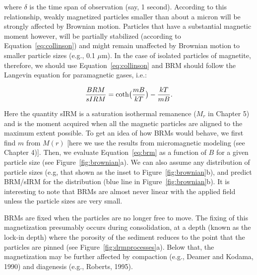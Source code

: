 \noindent where $\delta$ is the time span of observation (say, 1 second).  According to this relationship, weakly magnetized particles smaller than about a micron will  be strongly affected by Brownian motion.   Particles that have a substantial magnetic moment however, will be partially stabilized (according to Equation~\ref{eq:collinson}) and might remain unaffected by Brownian motion to smaller particle sizes (e.g., 0.1 $\mu$m).    In the case of isolated particles of magnetite, therefore, we should use Equation~\ref{eq:collinson} and BRM should follow the Langevin equation   for paramagnetic gases, i.e.:  

\begin{equation}
{ BRM\over{sIRM} } = { \hbox{coth} \bigl( {mB \over {kT}}\bigr)  - { kT \over {mB} }}.
\label{eq:brm}
\end{equation}

\noindent Here the quantity sIRM is a saturation isothermal remanence ($M_r$ in Chapter 5) and is the moment acquired when all the magnetic particles are aligned to the maximum extent possible.  To get an idea of how BRMs would behave, we first find $m$ from $M(r)$ [here we use the results from micromagnetic modeling (see Chapter 4)].     Then, we  evaluate Equation~\ref{eq:brm} as a function of $B$ for a given  particle size (see Figure~\ref{fig:brownian}a).     We can also assume any  distribution of particle sizes (e.g, that shown as the inset to Figure~\ref{fig:brownian}b), and  predict BRM/sIRM for the distribution (blue line in Figure~\ref{fig:brownian}b).   It is interesting to note that BRMs  are almost never linear with the applied field unless the particle sizes are very small.    




BRMs are   fixed when the particles are no longer free to move.  The fixing of this magnetization presumably occurs during consolidation, at a depth (known as the lock-in depth) where the porosity of the sediment reduces to the point that the particles are pinned (see Figure~\ref{fig:drmprocesses}a).  Below that, the magnetization may be further affected by 
compaction (e.g., 
\nocite{deamer90}
Deamer and Kodama, 1990)  and diagenesis (e.g., 
\nocite{roberts95}
Roberts, 1995).



